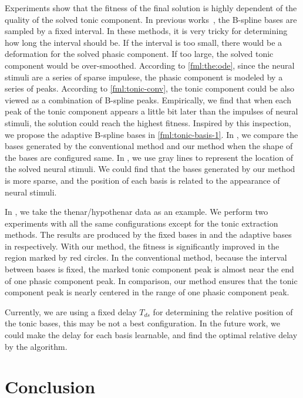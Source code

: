 \documentclass[10pt,conference]{ieeeconf}
\begin{document}
Experiments show that the fitness of the final solution is highly dependent of the quality of the solved tonic component. In previous works~\cite{greco2015cvxeda,amin2019tonic}, the B-spline bases are sampled by a fixed interval. In these methods, it is very tricky for determining how long the interval should be. If the interval is too small, there would be a deformation for the solved phasic component. If too large, the solved tonic component would be over-smoothed. According to \eqref{fml:the:ode}, since the neural stimuli are a series of sparse impulese, the phasic component is modeled by a series of peaks. According to \eqref{fml:tonic-conv}, the tonic component could be also viewed as a combination of B-spline peaks. Empirically, we find that when each peak of the tonic component appears a little bit later than the impulses of neural stimuli, the solution could reach the highest fitness. Inspired by this inspection, we propose the adaptive B-spline bases in \eqref{fml:tonic-basis-1}. In , we compare the bases generated by the conventional method and our method when the shape of the bases are configured same. In , we use gray lines to represent the location of the solved neural stimuli. We could find that the bases generated by our method is more sparse, and the position of each basis is related to the appearance of neural stimuli.

In , we take the thenar/hypothenar data as an example. We perform two experiments with all the same configurations except for the tonic extraction methods. The results are produced by the fixed bases in  and the adaptive bases in  respectively. With our method, the fitness is significantly improved in the region marked by red circles. In the conventional method, because the interval between bases is fixed, the marked tonic component peak is almost near the end of one phasic component peak. In comparison, our method ensures that the tonic component peak is nearly centered in the range of one phasic component peak.

Currently, we are using a fixed delay $T_{ds}$ for determining the relative position of the tonic bases, this may be not a best configuration. In the future work, we could make the delay for each basis learnable, and find the optimal relative delay by the algorithm. 

\section{Conclusion}
\end{document}
